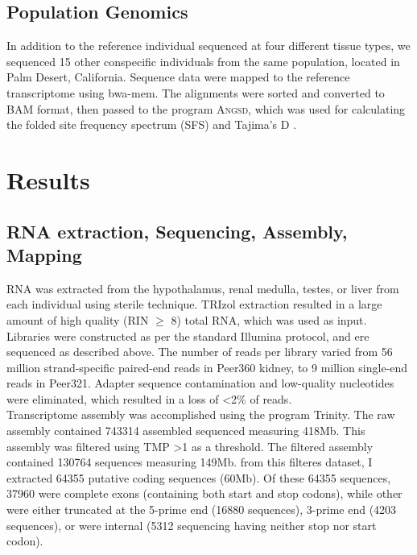 \documentclass[11pt]{article}
\begin{document}
\subsection*{Population Genomics}

In addition to the reference individual sequenced at four different tissue types, we sequenced 15 other conspecific individuals from the same population, located in Palm Desert, California. Sequence data were mapped to the reference transcriptome using bwa-mem. The alignments were sorted and converted to BAM format, then passed to the program \textsc{Angsd}, which was used for calculating the folded site frequency spectrum (SFS) and Tajima's D \cite{Korneliussen:2013uz}. \\


\section*{Results}

\subsection*{RNA extraction, Sequencing, Assembly, Mapping}

RNA was extracted from the hypothalamus, renal medulla, testes, or liver from each individual using sterile technique. TRIzol extraction resulted in a large amount of high quality (RIN $\geq$ 8) total RNA, which was used as input. Libraries were constructed as per the standard Illumina protocol, and ere sequenced as described above. The number of reads per library varied from 56 million strand-specific paired-end reads in Peer360 kidney, to 9 million single-end reads in Peer321. Adapter sequence contamination and low-quality nucleotides were eliminated, which resulted in a loss of \textless 2\% of reads. \\

Transcriptome assembly was accomplished using the program Trinity. The raw assembly contained 743314 assembled sequenced measuring 418Mb. This assembly was filtered using TMP \textgreater 1 as a threshold. The filtered assembly contained 130764 sequences measuring 149Mb. from this filteres dataset, I extracted 64355 putative coding sequences (60Mb). Of these 64355 sequences, 37960 were complete exons (containing both start and stop codons), while other were either truncated at the 5-prime end (16880 sequences), 3-prime end (4203 sequences), or were internal (5312 sequencing having neither stop nor start codon). 
\end{document}
